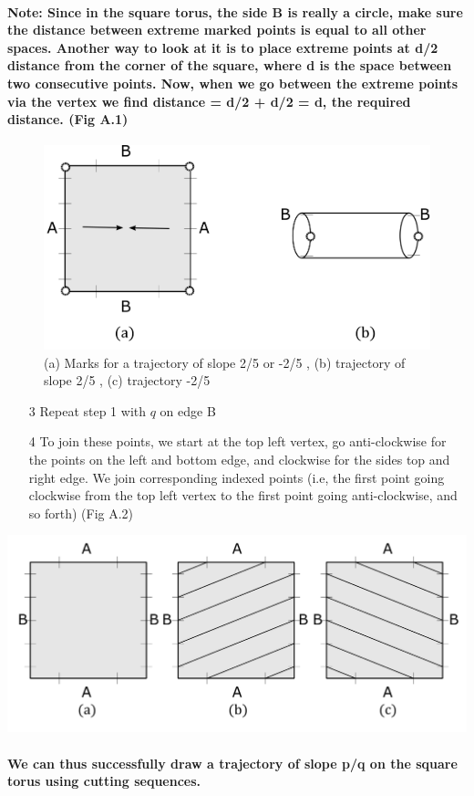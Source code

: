 \documentclass{report}
\begin{document}
\paragraph{Note: Since in the square torus, the side B is really a circle, make sure the distance between extreme marked points is equal to all other spaces. Another way to look at it is to place extreme points at d/2 distance from the corner of the square, where d is the space between two consecutive points. Now, when we go between the extreme points via the vertex we find distance = d/2 + d/2 = d, the required distance. (Fig A.1)}

\begin{figure} 
\begin{center}
\includegraphics[scale=0.3]{a.1}
\caption{(a) Marks for a trajectory of slope 2/5 or -2/5 , (b) trajectory of slope 2/5 , (c) trajectory -2/5}
\end{center}
\end{figure}

\begin{enumerate}
\item[3]  {Repeat step 1 with $q$ on edge B}

\item[4]  {To join these points, we start at the top left vertex, go anti-clockwise for the points on the left and bottom edge, and clockwise for the sides top and right edge. We join corresponding indexed points (i.e, the first point going clockwise from the top left vertex to the first point going anti-clockwise, and so forth) (Fig A.2)}
\end{enumerate}

\begin{center}
\includegraphics[scale=0.3]{a.2}
\end{center}

\paragraph{We can thus successfully draw a trajectory of slope p/q on the square torus using cutting sequences.}
\end{document}
